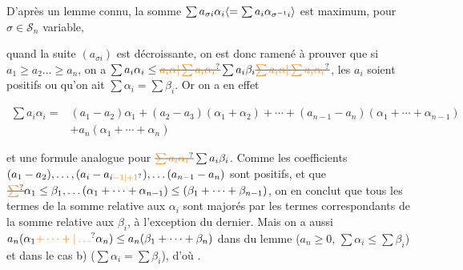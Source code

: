 
D'après un lemme connu,  la somme $\sum a_{\sigma i}\alpha_i\inserted{=\sum a_i\alpha_{\sigma^{-1}i}}$ est maximum, pour $\sigma\in\mathscr S_n$ variable,


quand la suite $(a_{\sigma i})$ est décroissante, on est donc   ramené à prouver que si $a_1\geq a_2\ldots\geq a_n$, on a $\sum a_i\alpha_i\leq\deleted{\unsure{a_i\alpha|\sum a_i\alpha_i}}\sum a_i\beta_i\deleted{\unsure{\sum a_i\alpha|\sum a_i\alpha_i}}$,  les $a_i$ soient positifs  ou qu'on ait $\sum\alpha_i=\sum\beta_i$. Or on a en effet

\[
\begin{aligned}
\sum a_i\alpha_i={}&(a_1-a_2)\alpha_1+(a_2-a_3)(\alpha_1+\alpha_2)+\cdots+(a_{n-1}-a_n)(\alpha_1+\cdots+\alpha_{n-1})\\
&+a_n(\alpha_1+\cdots+\alpha_n)
\end{aligned}\tag*{(9)}
\]

 et une formule analogue pour $\deleted{\unsure{\sum a_i\alpha_i}}\sum a_i\beta_i$. Comme les coefficients $(a_1-a_2),\ldots,(a_i-a_{i\unsure{-1|+1}}),\ldots(a_{n-1}-a_n)$ sont positifs,  et que $\deleted{\unsure{\sum}}\alpha_1\leq\beta_1,\ldots(\alpha_1+\cdots+\alpha_{n-1})\leq(\beta_1+\cdots+\beta_{n-1})$, on en conclut que tous les termes de la somme relative aux $\alpha_i$ sont majorés par les termes correspondants de la somme relative aux $\beta_i$, à l'exception  du dernier. Mais on a aussi $a_n(\alpha_1\unsure{+\cdots+|\ldots}\alpha_n)\leq a_n(\beta_1+\cdots+\beta_n)$ dans  du lemme ($a_n\geq0$, $\sum\alpha_i\leq\sum\beta_i$) et dans le cas b) ($\sum\alpha_i=\sum\beta_i$), d'où .

